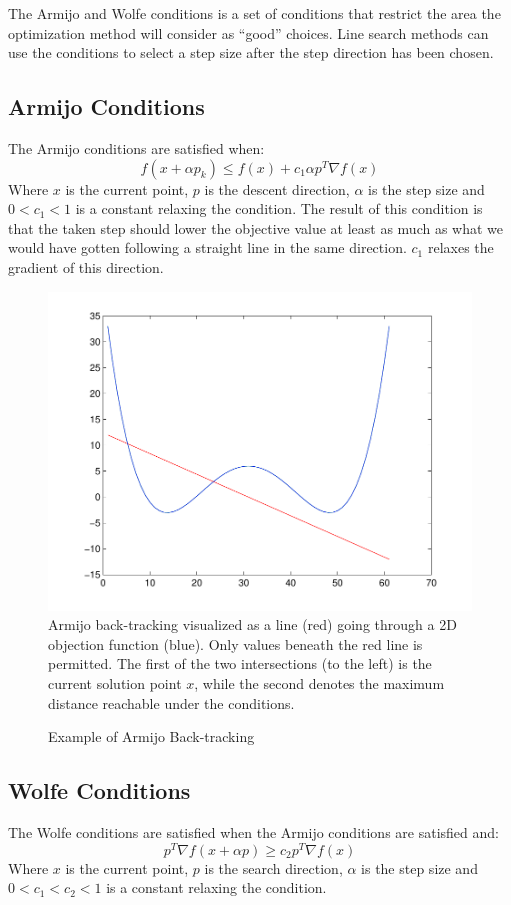 \documentclass[10pt,oneside,a4paper,final,english]{memoir}
\begin{document}
The Armijo and Wolfe conditions is a set of conditions that restrict
the area the optimization method will consider as ``good''
choices. Line search methods can use the conditions to select a step
size after the step direction has been chosen.

\subsection{Armijo Conditions}
The Armijo conditions are satisfied when:
\[ f(x +\alpha p_k) \leq f(x) + c_1\alpha p^T \nabla f(x) \] Where
$x$ is the current point, $p$ is the descent direction,
$\alpha$ is the step size and $0 < c_1 < 1$ is a constant relaxing the
condition. The result of this condition is that the taken step should
lower the objective value at least as much as what we would have
gotten following a straight line in the same direction. $c_1$ relaxes
the gradient of this direction.

\begin{figure}
\caption{Example of Armijo Back-tracking}
\includegraphics[width=\textwidth]{images/armijo_plot.pdf}
Armijo back-tracking visualized as a line (red) going through a 2D
objection function (blue). Only values beneath the red line is
permitted. The first of the two intersections (to the left) is the
current solution point $x$, while the second denotes the maximum distance
reachable under the conditions.
\end{figure}

\subsection{Wolfe Conditions}
The Wolfe conditions are satisfied when the Armijo conditions are
satisfied and:
\[ p^T \nabla f(x + \alpha p) \geq c_2 p^T \nabla f(x) \] Where $x$ is
the current point, $p$ is the search direction, $\alpha$ is the step
size and $0 < c_1 < c_2 < 1$ is a constant relaxing the condition.
\end{document}
